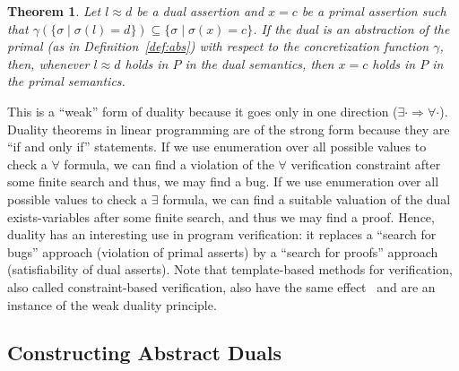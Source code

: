 \documentclass[preprint]{sig-alternate-05-2015}
\newtheorem{theorem}{Theorem}
\newcommand\ignore[1]{{}}
\def\ds{{\mathit{\theta}}}   %
\begin{document}
\begin{theorem}\label{thm:duality}
  Let $l\approx d$ be a dual assertion and $x=c$ be a primal assertion
  such that $\gamma(\{\sigma \mid \sigma(l)=d\}) \subseteq \{\sigma \mid \sigma(x)=c\}$.
  If the dual is an abstraction of the primal (as in Definition~\ref{def:abs})
  with respect to the concretization function $\gamma$,
  then, whenever
  $l \approx d$ holds in $P$ in the dual semantics, then
  $x = c$ holds in $P$ in the primal semantics.
\end{theorem}
\ignore{
\begin{proof}
  Let $\ds\in\semt(P)(U')$.
  Since $l\approx d$ holds in $P$ in the dual semantics,
  it follows that $\ds(l)=d$.
  Let $\sigma\in\sem(P)(U)$ be any reachable primal state.
  We need to show that $\sigma(x)=c$.
  Since the dual semantics is an abstraction of the primal,
  it follows from Theorem~\ref{thm:duality} that
  $\sigma\in\gamma(\ds)$.
  Since we assumed that
  $\gamma(\{\sigma \mid \sigma(l)=d\}) \subseteq \{\sigma \mid \sigma(x)=c\}$,
  and since $\ds(l)=d$,
  it follows that
  $\gamma(\ds) \subseteq \{\sigma \mid \sigma(x)=c\}$.
  Since $\sigma\in\gamma(\ds)$,
  it follows that $\sigma\in \{\sigma \mid \sigma(x)=c\}$,
  which implies $\sigma(x)=c$.
\end{proof}
\endignore}

This is a ``weak'' form of duality because it goes only in one direction
($\exists\cdot\Rightarrow\forall\cdot$).
Duality theorems in linear programming are of the strong form because
they are ``if and only if'' statements. %
If we use enumeration over all possible values to check a
$\forall$ formula, we can find a violation of the $\forall$ verification constraint
after some finite search and thus, we may find a bug.
If we use enumeration over all possible values to check a
$\exists$ formula, we can find a suitable valuation of the dual exists-variables 
after some finite search, and thus we may find a proof.
Hence, duality has an interesting use in program verification: it replaces a 
``search for bugs'' approach (violation of primal asserts)
by a ``search for proofs'' approach (satisfiability of dual asserts).
Note that template-based methods for verification, also called
constraint-based verification, also have the same effect~\cite{Gulwani08:PLDI,Gulwani13:STTT}
and are an instance of the weak duality principle.

\subsection{Constructing Abstract Duals}\label{sec:findingduals}
\end{document}
